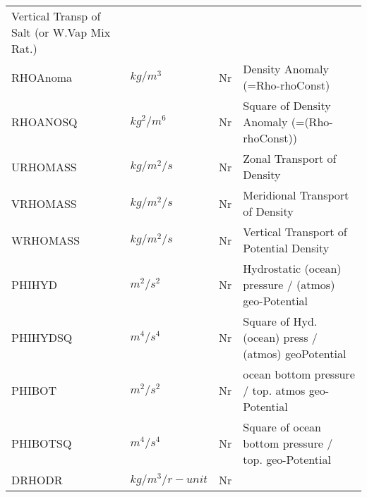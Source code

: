 \begin{table}
\begin{tabular}{llll}
\begin{minipage}[t]{3in}
          {Vertical Transp of Salt (or W.Vap Mix Rat.)} 
         \end{minipage}\\
 RHOAnoma & $kg/m^3  $  &  Nr  
         &\begin{minipage}[t]{3in}
          {Density Anomaly (=Rho-rhoConst)}
         \end{minipage}\\
 RHOANOSQ & $kg^2/m^6$  &  Nr  
         &\begin{minipage}[t]{3in}
          {Square of Density Anomaly (=(Rho-rhoConst))}
         \end{minipage}\\
 URHOMASS & $kg/m^2/s$  &  Nr  
         &\begin{minipage}[t]{3in}
          {Zonal Transport of Density}
         \end{minipage}\\
 VRHOMASS & $kg/m^2/s$  &  Nr  
         &\begin{minipage}[t]{3in}
          {Meridional Transport of Density}
         \end{minipage}\\
 WRHOMASS & $kg/m^2/s$  &  Nr  
         &\begin{minipage}[t]{3in}
          {Vertical Transport of Potential Density}
         \end{minipage}\\
 PHIHYD   & $m^2/s^2 $  &  Nr  
         &\begin{minipage}[t]{3in}
          {Hydrostatic (ocean) pressure / (atmos) geo-Potential}
         \end{minipage}\\
 PHIHYDSQ & $m^4/s^4 $  &  Nr  
         &\begin{minipage}[t]{3in}
          {Square of Hyd. (ocean) press / (atmos) geoPotential}
         \end{minipage}\\
 PHIBOT   & $m^2/s^2 $  &  Nr  
         &\begin{minipage}[t]{3in}
          {ocean bottom pressure / top. atmos geo-Potential}
         \end{minipage}\\
 PHIBOTSQ & $m^4/s^4 $  &  Nr  
         &\begin{minipage}[t]{3in}
          {Square of ocean bottom pressure / top. geo-Potential}
         \end{minipage}\\
 DRHODR   & $kg/m^3/{r-unit}$ & Nr

\end{tabular}
\end{table}
